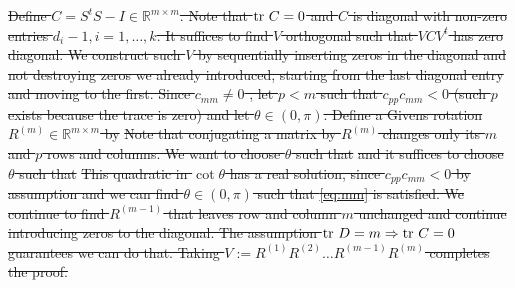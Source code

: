 \documentclass[ba]{imsart}
\newcommand{\R}{\ensuremath{\mathbb{R}}}
\newcommand{\ttr}[1]{\textup{tr}\ #1}
\theoremstyle{plain}
\theoremstyle{definition}
\theoremstyle{remark}
\providecommand{\DIFdeltex}[1]{{\protect\color{red}\sout{#1}}}                      %
\providecommand{\DIFdelbegin}{} %
\providecommand{\DIFdel}[1]{\texorpdfstring{\DIFdeltex{#1}}{}} %
\newcommand{\DIFscaledelfig}{0.5}
\newlength{\DIFdelgraphicswidth} %
\newlength{\DIFdelgraphicsheight} %
\newcommand{\DIFdelincludegraphics}[2][]{%
\sbox{\DIFdelgraphicsbox}{\DIFOincludegraphics[#1]{#2}}%
\settoboxwidth{\DIFdelgraphicswidth}{\DIFdelgraphicsbox} %
\settoboxtotalheight{\DIFdelgraphicsheight}{\DIFdelgraphicsbox} %
\scalebox{\DIFscaledelfig}{%
\parbox[b]{\DIFdelgraphicswidth}{\usebox{\DIFdelgraphicsbox}\\[-\baselineskip] \rule{\DIFdelgraphicswidth}{0em}}\llap{\resizebox{\DIFdelgraphicswidth}{\DIFdelgraphicsheight}{%
\setlength{\unitlength}{\DIFdelgraphicswidth}%
\begin{picture}(1,1)%
\thicklines\linethickness{2pt} %
{\color[rgb]{1,0,0}\put(0,0){\framebox(1,1){}}}%
{\color[rgb]{1,0,0}\put(0,0){\line( 1,1){1}}}%
{\color[rgb]{1,0,0}\put(0,1){\line(1,-1){1}}}%
\end{picture}%
}\hspace*{3pt}}} %
} %
\DeclareRobustCommand{\DIFdelbegin}{\DIFOdelbegin \let\includegraphics\DIFdelincludegraphics} %
\begin{document}
\DIFdelbegin \DIFdel{Define $C = S^tS - I \in \R^{m \times m}$. Note that $\ttr C = 0$ and
  $C$ is diagonal with non-zero entries $d_i-1,i=1,\dots,k$. It suffices
  to find $V$ orthogonal such that $V C V^t$ has zero diagonal. We
  construct such $V$ by sequentially inserting zeros in the
diagonal
  and not destroying zeros we already introduced, starting from the
  last diagonal entry and moving to the first. Since $c_{mm} \neq 0$ ,
  let $p < m$ such that $c_{pp}c_{mm} < 0$ (such $p$ exists because
  the trace is zero) and let $\theta \in (0,\pi)$. Define a Givens
  rotation $R^{(m)} \in \R^{m \times m}$ by
  }%
\DIFdel{Note that conjugating a matrix by $R^{(m)}$ changes only its $m$ and
  $p$ rows and columns. We want to choose $\theta$ such that }%
\DIFdel{and it suffices to choose $\theta$ such that
  }%
\DIFdel{This quadratic in $\cot\theta$ has a real solution, since
  $c_{pp}c_{mm} < 0$ by assumption and we
can find $\theta \in
  (0,\pi)$ such that \eqref{eq:mm} is satisfied.
We continue to find
  $R^{(m-1)}$ that leaves row and column $m$ unchanged and
  continue introducing zeros to the diagonal. The assumption $\ttr D =
  m \Rightarrow \ttr C = 0$ guarantees we can do that. Taking $V:=
  R^{(1)} R^{(2)} \dots R^{(m-1)}R^{(m)}$ completes the proof.
}%
\end{document}
